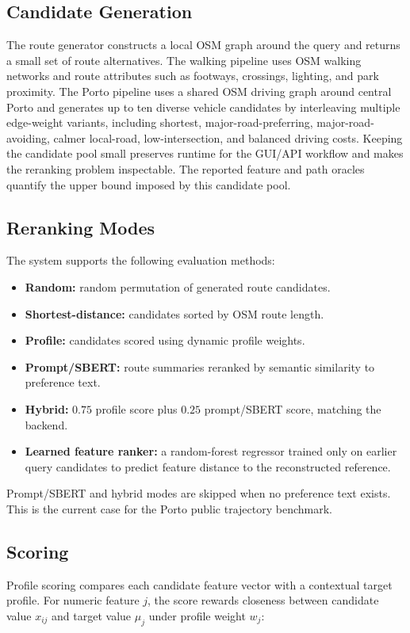 \subsection{Candidate Generation}
The route generator constructs a local OSM graph around the query and returns a small set of route alternatives. The walking pipeline uses OSM walking networks and route attributes such as footways, crossings, lighting, and park proximity. The Porto pipeline uses a shared OSM driving graph around central Porto and generates up to ten diverse vehicle candidates by interleaving multiple edge-weight variants, including shortest, major-road-preferring, major-road-avoiding, calmer local-road, low-intersection, and balanced driving costs. Keeping the candidate pool small preserves runtime for the GUI/API workflow and makes the reranking problem inspectable. The reported feature and path oracles quantify the upper bound imposed by this candidate pool.

\subsection{Reranking Modes}
The system supports the following evaluation methods:

\begin{itemize}
  \item \textbf{Random:} random permutation of generated route candidates.
  \item \textbf{Shortest-distance:} candidates sorted by OSM route length.
  \item \textbf{Profile:} candidates scored using dynamic profile weights.
  \item \textbf{Prompt/SBERT:} route summaries reranked by semantic similarity to preference text.
  \item \textbf{Hybrid:} $0.75$ profile score plus $0.25$ prompt/SBERT score, matching the backend.
  \item \textbf{Learned feature ranker:} a random-forest regressor trained only on earlier query candidates to predict feature distance to the reconstructed reference.
\end{itemize}

Prompt/SBERT and hybrid modes are skipped when no preference text exists. This is the current case for the Porto public trajectory benchmark.

\subsection{Scoring}
Profile scoring compares each candidate feature vector with a contextual target profile. For numeric feature $j$, the score rewards closeness between candidate value $x_{ij}$ and target value $\mu_j$ under profile weight $w_j$:

